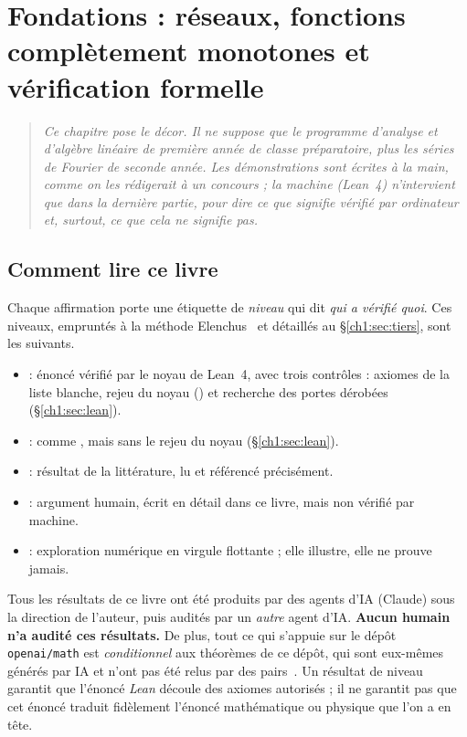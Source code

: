 \chapter{Fondations : réseaux, fonctions complètement monotones et vérification formelle}
\label{ch1:chap}

\begin{quote}\small\itshape
Ce chapitre pose le décor. Il ne suppose que le programme d'analyse et d'algèbre linéaire de première année de classe préparatoire,
plus les séries de Fourier de seconde année. Les démonstrations sont écrites à la main, comme on les rédigerait à un concours ;
la machine (Lean~4) n'intervient que dans la dernière partie, pour dire ce que signifie \og vérifié par ordinateur \fg{} et, surtout,
ce que cela ne signifie pas.
\end{quote}

\section*{Comment lire ce livre}

Chaque affirmation porte une étiquette de \emph{niveau} qui dit \emph{qui a vérifié quoi}.
Ces niveaux, empruntés à la méthode Elenchus~\cite{elenchus} et détaillés au §\ref{ch1:sec:tiers}, sont les suivants.
\begin{itemize}
\item \tierA{} : énoncé vérifié par le noyau de Lean~4, avec trois contrôles : axiomes de la liste blanche, rejeu du noyau () et recherche des portes dérobées (§\ref{ch1:sec:lean}).
\item \tierAs{} : comme \tierA{}, mais sans le rejeu du noyau (§\ref{ch1:sec:lean}).
\item \tierL{} : résultat de la littérature, lu et référencé précisément.
\item \tierC{} : argument humain, écrit en détail dans ce livre, mais non vérifié par machine.
\item \tierX{} : exploration numérique en virgule flottante ; elle illustre, elle ne prouve jamais.
\end{itemize}

\begin{warnbox}
Tous les résultats de ce livre ont été produits par des agents d'IA (Claude) sous la direction de l'auteur, puis audités
par un \emph{autre} agent d'IA. \textbf{Aucun humain n'a audité ces résultats.} De plus, tout ce qui s'appuie sur le dépôt
\texttt{openai/math} est \emph{conditionnel} aux théorèmes de ce dépôt, qui sont eux-mêmes générés par IA et n'ont pas été
relus par des pairs~\cite{oai}. Un résultat de niveau \tierA{} garantit que l'énoncé \emph{Lean} découle des axiomes
autorisés ; il ne garantit pas que cet énoncé traduit fidèlement l'énoncé mathématique ou physique que l'on a en tête.
\end{warnbox}

